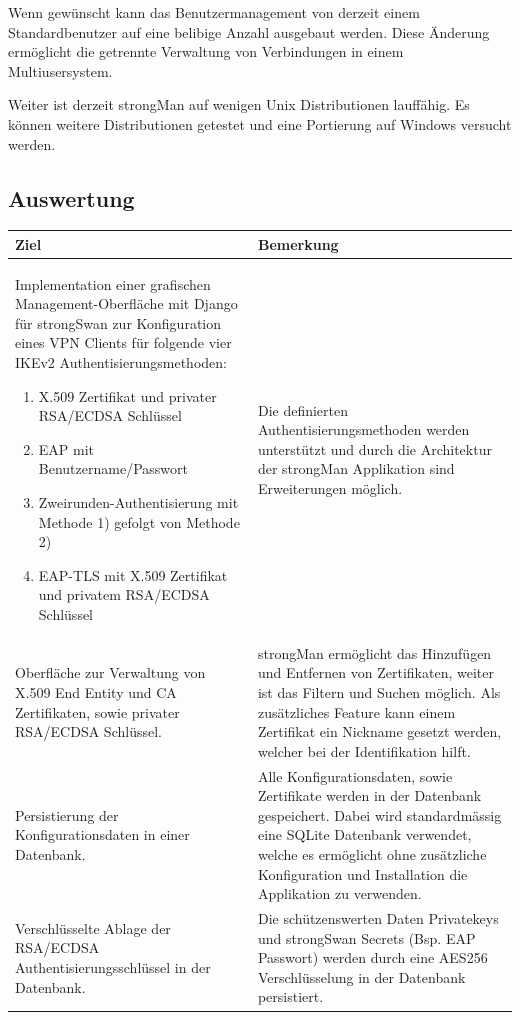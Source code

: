 Wenn gewünscht kann das Benutzermanagement von derzeit einem Standardbenutzer auf eine belibige Anzahl ausgebaut werden. Diese Änderung ermöglicht die getrennte Verwaltung von Verbindungen in einem Multiusersystem.

Weiter ist derzeit strongMan auf wenigen Unix Distributionen lauffähig. Es können weitere Distributionen getestet und eine Portierung auf Windows versucht werden.


\subsection{Auswertung}
\begin{table}[H]
	\centering
    \begin{tabular}{|p{}|p{}|}
    \hline    
    \rowcolor{lightblue}
	Ziel &  Bemerkung\\ \hline   
	Implementation einer grafischen Management-Oberfläche mit Django für strongSwan
    zur Konfiguration eines VPN Clients für folgende vier IKEv2 Authentisierungsmethoden:
    \begin{enumerate}
        \item X.509 Zertifikat und privater RSA/ECDSA Schlüssel
        \item EAP mit Benutzername/Passwort
        \item Zweirunden-Authentisierung mit Methode 1) gefolgt von Methode 2)
        \item EAP-TLS mit X.509 Zertifikat und privatem RSA/ECDSA Schlüssel
    \end{enumerate}
	& Die definierten Authentisierungsmethoden werden unterstützt und durch die Architektur der strongMan Applikation sind Erweiterungen möglich.  \\ \hline
	Oberfläche zur Verwaltung von X.509 End Entity und CA Zertifikaten, sowie privater
    RSA/ECDSA Schlüssel. & strongMan ermöglicht das Hinzufügen und Entfernen von Zertifikaten,  weiter ist das Filtern und Suchen möglich. Als zusätzliches Feature kann einem Zertifikat ein Nickname gesetzt werden, welcher bei der Identifikation hilft.
    \\ \hline
    Persistierung der Konfigurationsdaten in einer Datenbank. & Alle Konfigurationsdaten, sowie Zertifikate werden in der Datenbank gespeichert. Dabei wird standardmässig eine SQLite Datenbank verwendet, welche es ermöglicht ohne zusätzliche Konfiguration und Installation die Applikation zu verwenden. \\ \hline
    Verschlüsselte Ablage der RSA/ECDSA Authentisierungsschlüssel in der Datenbank. & Die schützenswerten Daten Privatekeys und strongSwan Secrets (Bsp. EAP Passwort) werden durch eine AES256 Verschlüsselung in der Datenbank persistiert. \\ \hline

\end{tabular}
\end{table}
